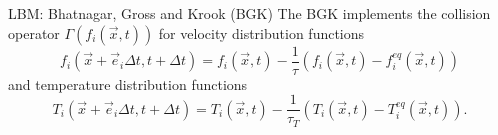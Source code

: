 \documentclass{beamer}
\begin{document}


\begin{frame}{LBM: Bhatnagar, Gross and Krook (BGK)}
The BGK implements the collision operator $\Gamma(f_i(\vec{x}, t))$ for velocity distribution functions
\begin{equation}\label{eq:bgk}
f_i(\vec{x}+\vec{e}_i \Delta t, t+\Delta t) = f_i(\vec{x},t) - \frac{1}{\tau} \left( f_i(\vec{x},t)-f_i^{eq}(\vec{x},t) \right)
\end{equation}
and temperature distribution functions
\begin{equation}\label{eq:bgk_t}
T_i(\vec{x}+\vec{e}_i \Delta t, t+\Delta t) = T_i(\vec{x},t) - \frac{1}{\tau_T} \left( T_i(\vec{x},t)-T_i^{eq}(\vec{x},t) \right).
\end{equation}
\end{frame}
\end{document}

